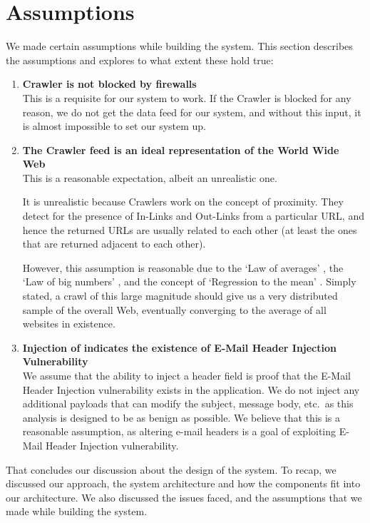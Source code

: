 \section{Assumptions}
We made certain assumptions while building the system. This section describes the assumptions and explores to what extent these hold true:
\begin{enumerate}
	\item \textbf{Crawler is not blocked by firewalls}\\
	This is a requisite for our system to work. If the Crawler is blocked for any reason, we do not get the data feed for our system, and without this input, it is almost impossible to set our system up.
	\item \textbf{The Crawler feed is an ideal representation of the World Wide Web} \\
	This is a reasonable expectation, albeit an unrealistic one.
	
	It is unrealistic because Crawlers work on the concept of proximity. They detect for the presence of In-Links and Out-Links from a particular URL, and hence the returned URLs are usually related to each other (at least the ones that are returned adjacent to each other).
	
	However, this assumption is reasonable due to the `Law of averages' \cite{wiki:Law_of_averages}, the `Law of big numbers' \cite{wiki:Law_of_large_numbers}, and the concept of `Regression to the mean' \cite{wiki:Regression_toward_the_mean}. Simply stated, a crawl of this large magnitude should give us a very distributed sample of the overall Web, eventually converging to the average of all websites in existence.
	
	\item \textbf{Injection of  indicates the existence of E-Mail Header Injection Vulnerability} \\
	We assume that the ability to inject a  header field is proof that the E-Mail Header Injection vulnerability exists in the application. We do not inject any additional payloads that can modify the subject, message body, etc.\ as this analysis is designed to be as benign as possible.
	We believe that this is a reasonable assumption, as altering e-mail headers is a goal of exploiting E-Mail Header Injection vulnerability.
\end{enumerate}

That concludes our discussion about the design of the system. To recap, we discussed our approach, the system architecture and how the components fit into our architecture. We also discussed the issues faced, and the assumptions that we made while building the system. %